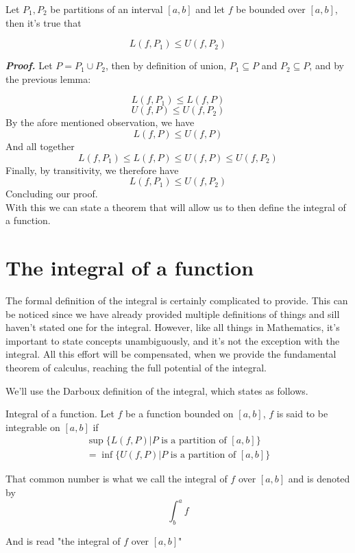 \documentclass{report}
\begin{document}
    \begin{thBox}
        Let $P_1, P_2$ be partitions of an interval $[a,b]$ and let $f$ be bounded over $[a,b]$, then it's true that

        $$L(f, P_1) \leq U(f, P_2)$$
    \end{thBox}

    \textit{\textbf{Proof.}} Let $P = P_1 \cup P_2$, then by definition of union, $P_1 \subseteq P$ and $P_2 \subseteq P$, and by the previous lemma:

    $$L(f, P_1) \leq L(f, P)$$
    $$U(f, P) \leq U(f, P_2)$$
    By the afore mentioned observation, we have
    $$L(f, P) \leq U(f, P)$$
    And all together
    $$L(f, P_1) \leq L(f, P) \leq U(f, P) \leq U(f, P_2)$$
    Finally, by transitivity, we therefore have
    $$L(f, P_1) \leq U(f, P_2)$$
    Concluding our proof.\\

    With this we can state a theorem that will allow us to then define the integral of a function.
    \section*{The integral of a function}

    The formal definition of the integral is certainly complicated to provide. This can be noticed since we have already provided multiple definitions of things and sill haven't stated one for the integral. However, like all things in Mathematics, it's important to state concepts unambiguously, and it's not the exception with the integral. All this effort will be compensated, when we provide the fundamental theorem of calculus, reaching the full potential of the integral.

    We'll use the Darboux definition of the integral, which states as follows.

    \begin{defBox}
        Integral of a function. Let $f$ be a function bounded on $[a,b]$, $f$ is said to be integrable on $[a,b]$ if
        \begin{align*}
            \sup\{L(f,P) | P \text{ is a partition of } [a,b]\} \\
            = \inf\{U(f,P) | P \text{ is a partition of } [a,b]\}
        \end{align*}

        That common number is what we call the integral of $f$ over $[a,b]$ and is denoted by
        $$\int_{b}^{a}f$$

        And is read "the integral of $f$ over $[a,b]$"
    \end{defBox}
\end{document}
